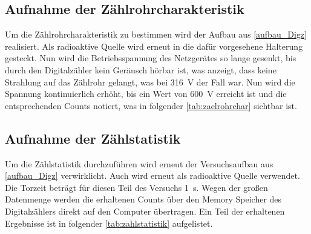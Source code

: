 \documentclass[12pt,english,ngerman]{scrartcl}
\begin{document}
\subsection{Aufnahme der Zählrohrcharakteristik}

Um die Zählrohrcharakteristik zu bestimmen wird der Aufbau aus
\autoref{aufbau_Digz} realisiert. Als radioaktive Quelle wird erneut
 in die dafür vorgesehene Halterung gesteckt. Nun wird die
Betriebsspannung des Netzgerätes so lange gesenkt, bis durch den Digitalzähler
kein Geräusch hörbar ist, was anzeigt, dass keine Strahlung auf das Zählrohr
gelangt, was bei \SI{316}{\volt} der Fall war. Nun wird die Spannung
kontinuierlich erhöht, bis ein Wert von \SI{600}{\volt} erreicht ist und die
entsprechenden Counts notiert, was in folgender \autoref{tab:zaelrohrchar}
sichtbar ist.

\begin{table}[H]
	\caption[Erhaltene Zählraten für die Zählrohrcharakteristik]{
		Erhaltene Zählraten für
		die Zählrohrcharakteristik bei einer Torzeit von \SI{10}{\second} und einem
		Abstand der radioaktiven Quelle von \SI{15(2)}{\mm}. Zählraten sind exakt.                       \\
		\(U \dots\) eingestellte Betriebsspannung in \si{\volt} mit einer Unsicherheit von \SI{2}{\volt} \\
		\(z_{i} \dots\) erhaltene Zählrate bei der entsprechenden Betriebsspannung
	}
	\label{tab:zaelrohrchar}
	\begin{center}
		
	\end{center}
\end{table}

\subsection{Aufnahme der Zählstatistik}

Um die Zählstatistik durchzuführen wird erneut der Versuchsaufbau aus
\autoref{aufbau_Digz} verwirklicht. Auch wird erneut  als
radioaktive Quelle verwendet. Die Torzeit beträgt für diesen Teil des Versuchs
\SI{1}{\second}. Wegen der großen Datenmenge werden die erhaltenen Counts über
den Memory Speicher des Digitalzählers direkt auf den Computer übertragen. Ein
Teil der erhaltenen Ergebnisse ist in folgender \autoref{tab:zahlstatistik}
aufgelistet.
\end{document}
